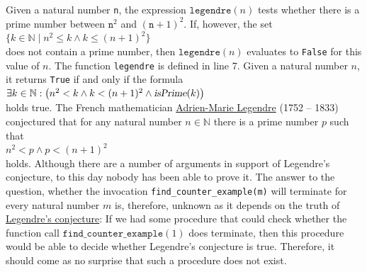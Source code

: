Given a natural number \texttt{n}, the expression
$\texttt{legendre}(n)$ tests whether there is a prime number between $\texttt{n}^2$ and $(\texttt{n}+1)^2$.  
If, however, the set
\\[0.2cm]
\hspace*{1.3cm}
$\{ k \in \mathbb{N} \mid n^2 \leq k \wedge k \leq (n+1)^2 \}$
\\[0.2cm]
does not contain a prime number, then $\texttt{legendre}(n)$ evaluates
to \texttt{False} for this value of $n$.  The function \texttt{legendre} is defined in line 7.  
Given a natural number $n$, it returns \texttt{True} if and only if the formula
\\[0.2cm]
\hspace*{1.3cm}
$\exists k \in \mathbb{N}:\bigl( n^2 < k \wedge k < (n+1)^2 \wedge \textsl{isPrime}(k)\bigr)$
\\[0.2cm]
holds true.  The French mathematician 
\href{http://en.wikipedia.org/wiki/Adrien-Marie_Legendre}{Adrien-Marie Legendre} (1752 -- 1833) conjectured that
for any natural number $n \in \mathbb{N}$ there is a prime number $p$ such that
\\[0.2cm]
\hspace*{1.3cm}
$n^2 < p \wedge  p < (n+1)^2$
\\[0.2cm]
holds.  Although there are a number of arguments in support of Legendre's conjecture,  to this day
nobody has been able to prove it.  The answer to the question, whether the invocation \texttt{find\_counter\_example(m)} will
terminate for every natural number $m$ is, therefore, unknown as it depends on the truth of 
\href{http://en.wikipedia.org/wiki/Legendre's_conjecture}{Legendre's conjecture}:  If we
had some procedure that could check whether the function call $\texttt{find\_counter\_example}(1)$ does terminate,
then this procedure would be able to decide whether Legendre's conjecture is true.  Therefore, it
should come as no surprise that such a procedure does not exist.


